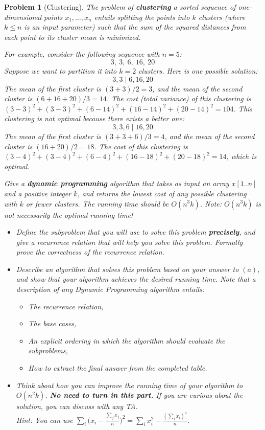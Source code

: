 \documentclass[10pt]{article}
\newtheorem{problem}{\sc\color{cit}Problem}
\begin{document}

\begin{problem}[Clustering]
The problem of \textbf{clustering} a sorted sequence of one-dimensional points $x_1, \dots, x_n$ entails splitting the points into $k$ clusters (where $k \leq n$ is an input parameter) such that the sum of the squared distances from each point to its cluster mean is minimized.

For example, consider the following sequence with $n = 5$:
$$3,\ 3,\ 6,\ 16,\ 20$$
Suppose we want to partition it into $k=2$ clusters. Here is one possible solution:
$$3, 3 \mid 6, 16, 20$$
The mean of the first cluster is $(3+3)/2 = 3$, and the mean of the second cluster is $(6+16+20)/3 = 14$. The cost (total variance) of this clustering is $(3-3)^2 + (3-3)^2 + (6-14)^2 + (16-14)^2 + (20-14)^2 = 104$. This clustering is not optimal because there exists a better one:
$$3, 3, 6 \mid 16, 20$$
The mean of the first cluster is $(3+3+6)/3 = 4$, and the mean of the second cluster is $(16+20)/2 = 18$. The cost of this clustering is $(3-4)^2 + (3-4)^2 + (6-4)^2 + (16-18)^2 + (20-18)^2 = 14$, which is optimal.

Give a \textbf{dynamic programming} algorithm that takes as input an array $x[1..n]$ and a positive integer $k$, and returns the lowest cost of any possible clustering with $k$ or fewer clusters. The running time should be $O(n^3k)$. Note: $O(n^3k)$ is not necessarily the optimal running time!

\begin{itemize}
    \item[(a)] Define the subproblem that you will use to solve this problem \textbf{precisely}, and give a recurrence relation that will help you solve this problem. Formally prove the correctness of the recurrence relation.
    \item[(b)] Describe an algorithm that solves this problem based on your answer to $(a)$, and show that your algorithm achieves the desired running time. Note that a description of any Dynamic Programming algorithm entails:
    \begin{itemize}
        \item The recurrence relation,
        \item The base cases,
        \item An explicit ordering in which the algorithm should evaluate the subproblems,
        \item How to extract the final answer from the completed table.
    \end{itemize}
    \item[(c)] Think about how you can improve the running time of your algorithm to $O(n^2 k)$. \textbf{No need to turn in this part.} If you are curious about the solution, you can discuss with any TA. \\
\textit{Hint:} You can use $\sum_{i} \big(x_i - \frac{\sum_j x_j}{n}\big)^2 = \sum_i x_i^2 - \frac{(\sum_i x_i)^2}{n}$.
\end{itemize}
\end{problem}
\end{document}
